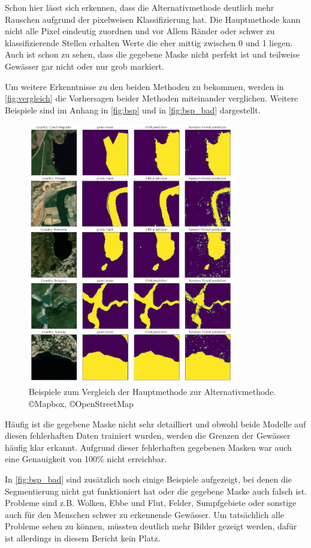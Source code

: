 Schon hier lässt sich erkennen, dass die Alternativmethode deutlich mehr Rauschen aufgrund der pixelweisen Klassifizierung hat.
Die Hauptmethode kann nicht alle Pixel eindeutig zuordnen und vor Allem Ränder oder schwer zu klassifizierende Stellen erhalten Werte die eher mittig zwischen 0 und 1 liegen.
Auch ist schon zu sehen, dass die gegebene Maske nicht perfekt ist und teilweise Gewässer gar nicht oder nur grob markiert.

Um weitere Erkenntnisse zu den beiden Methoden zu bekommen, werden in \autoref{fig:vergleich} die Vorhersagen beider Methoden miteinander verglichen.
Weitere Beispiele sind im Anhang in \autoref{fig:bsp} und in \autoref{fig:bsp_bad} dargestellt.

\begin{figure}
    \centering
    \includegraphics[width=0.8\textwidth]{images/vergleich.png}
    \caption{Beispiele zum Vergleich der Hauptmethode zur Alternativmethode.\\ \copyright Mapbox, \copyright OpenStreetMap}
    \label{fig:vergleich}
\end{figure}

Häufig ist die gegebene Maske nicht sehr detailliert 
und obwohl beide Modelle auf diesen fehlerhaften Daten trainiert wurden,
werden die Grenzen der Gewässer häufig klar erkannt.
Aufgrund dieser fehlerhaften gegebenen Masken war auch eine Genauigkeit von 100\% nicht erreichbar.

In \autoref{fig:bsp_bad} sind zusätzlich noch einige Beispiele aufgezeigt, 
bei denen die Segmentierung nicht gut funktioniert hat 
oder die gegebene Maske auch falsch ist.
Probleme sind z.B. Wolken, Ebbe und Flut, Felder, Sumpfgebiete oder sonstige auch für den Menschen schwer zu erkennende Gewässer.
Um tatsächlich alle Probleme sehen zu können, müssten deutlich mehr Bilder gezeigt werden, dafür ist allerdings in diesem Bericht kein Platz.
